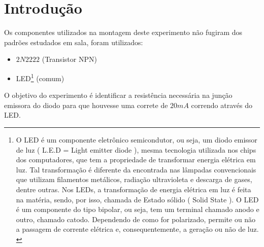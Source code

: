 \chapter*[Introdu\c{c}\~{a}o]{Introdu\c{c}\~{a}o}

	Os componentes utilizados na montagem deste experimento não fugiram dos padrões estudados em sala, foram utilizados:

\begin{itemize}
	\item $ 2N2222 $ (Transistor NPN)
	\item LED\footnote[1] {O LED é um componente eletrônico semicondutor, ou seja, um diodo emissor de luz ( L.E.D = Light emitter diode ), mesma tecnologia utilizada nos chips dos computadores, que tem a propriedade de transformar energia elétrica em luz. Tal transformação é diferente da encontrada nas lâmpadas convencionais que utilizam filamentos metálicos, radiação ultravioleta e descarga de gases, dentre outras. Nos LEDs, a transformação de energia elétrica em luz é feita na matéria, sendo, por isso, chamada de Estado sólido ( Solid State ). O LED é um componente do tipo bipolar, ou seja, tem um terminal chamado anodo e outro, chamado catodo. Dependendo de como for polarizado, permite ou não a passagem de corrente elétrica e, consequentemente, a geração ou não de luz. \cite{intro}
	} (comum)
\end{itemize}
	
	
	O objetivo do experimento é identificar a resistência necessária na junção emissora do diodo para que houvesse uma correte de $ 20mA $ correndo através do LED. 
